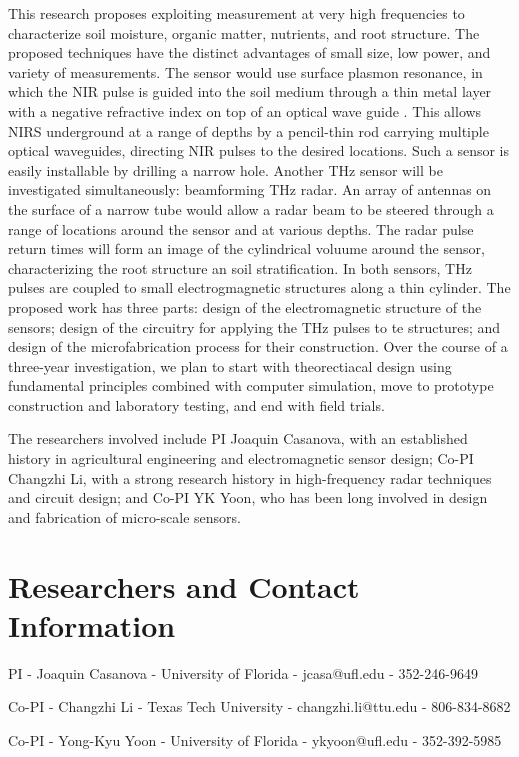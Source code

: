 \documentclass[11pt,letterpaper]{article}
\begin{document}
This research proposes exploiting measurement at very high frequencies to characterize soil moisture, organic matter, nutrients, and root structure. The proposed techniques have the distinct advantages of small size, low power, and variety of measurements. The sensor would use surface plasmon resonance, in which the NIR pulse is guided into the soil medium through a thin metal layer with a negative refractive index on top of an optical wave guide \cite{shibayama2016surface}. This allows NIRS underground at a range of depths by a pencil-thin rod carrying multiple optical waveguides, directing NIR pulses to the desired locations. Such a sensor is easily installable by drilling a narrow hole. Another THz sensor will be investigated simultaneously: beamforming THz radar. An array of antennas on the surface of a narrow tube would allow a radar beam to be steered through a range of locations around the sensor and at various depths. The radar pulse return times will form an image of the cylindrical voluume around the sensor, characterizing the root structure an soil stratification. In both sensors, THz pulses are coupled to small electrogmagnetic structures along a thin cylinder. The proposed work has three parts: design of the electromagnetic structure of the sensors; design of the circuitry for applying the THz pulses to te structures; and design of the microfabrication process for their construction. Over the course of a three-year investigation, we plan to start with theorectiacal design using fundamental principles combined with computer simulation, move to prototype construction and laboratory testing, and end with field trials.

The researchers involved include PI Joaquin Casanova, with an established history in agricultural engineering and electromagnetic sensor design; Co-PI Changzhi Li, with a strong research history in high-frequency radar techniques and circuit design; and Co-PI YK Yoon, who has been long involved in design and fabrication of micro-scale sensors. 

\section{Researchers and Contact Information}
\begin{description}
\item{PI} - Joaquin Casanova - University of Florida - jcasa@ufl.edu - 352-246-9649
\item{Co-PI} - Changzhi Li - Texas Tech University - changzhi.li@ttu.edu - 806-834-8682
\item{Co-PI} - Yong-Kyu Yoon -  University of Florida - ykyoon@ufl.edu  - 352-392-5985
\end{description}



  
  
\end{document}
